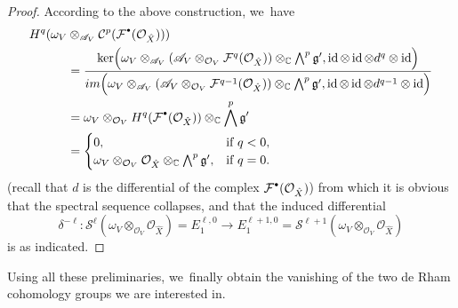 \documentclass[11pt]{article}
\let\mathds\mathbb
\newcommand{\sbullet}{{\scriptscriptstyle\bullet}}
\newcommand{\csbullet}{{\raisebox{1pt}{$\sbullet$}}}
\newcommand{\dC}{{\mathds C}}\let\C\dC
\newcommand{\cA}{\mathscr{A}}
\newcommand{\cC}{\mathcal{C}}
\newcommand{\cF}{\mathcal{F}}
\newcommand{\cO}{\mathcal{O}}\let\O\cO
\newcommand{\cS}{\mathcal{S}}
\newcommand{\frg}{\mathfrak{g}}
\DeclareMathOperator{\id}{\textup{id}}
\begin{document}
\begin{proof}
According to the above construction, we~have
\begin{align*}
H^q(\omega_V&\otimes_{\cA_V}
\cC^p(\cF^{\csbullet}(\cO_{\hat{X}})))\\
&=\frac{\ker\Bigl(\omega_V\otimes_{\cA_V}(\cA_V\otimes_{\cO_V}\cF^q(\cO_{\hat{X}}))\otimes_\dC\bigwedge^p\frg',\id\otimes\id\otimes d^q\otimes\id\Bigr)}{\textup{im}\Bigl(\omega_V\otimes_{\cA_V}(\cA_V\otimes_{\cO_V}\cF^{q-1}(\cO_{\hat{X}}))\otimes_\dC\bigwedge^p\frg',\id\otimes\id\otimes d^{q-1}\otimes\id\Bigr)}\\
&= \omega_V\otimes_{\cO_V} H^q(\cF^{\csbullet}(\cO_{\hat{X}}))\otimes_\dC\bigwedge^p \frg'\\
&=
\begin{cases}
0, &\text{if }q<0,\\
\omega_V\otimes_{\cO_V}\cO_{\hat{X}}\otimes_\dC\bigwedge^p \frg', &\text{if }q=0.
\end{cases}
\end{align*}
(recall that $d$ is the differential of the complex $\cF^{\csbullet}(\cO_{\hat{X}})$)
from which it is obvious that the spectral sequence collapses, and that the induced differential
\[
\delta^{-\ell} \colon \cS^\ell(\omega_V\otimes_{\cO_V}\cO_{\hat{X}})=E_1^{\ell,0}\to E_1^{\ell+1,0}=\cS^{\ell+1}(\omega_V\otimes_{\cO_V}\cO_{\hat{X}})
\]
is as indicated.
\end{proof}

Using all these preliminaries, we~finally obtain the vanishing of the two de Rham cohomology groups we are interested in.
\end{document}
